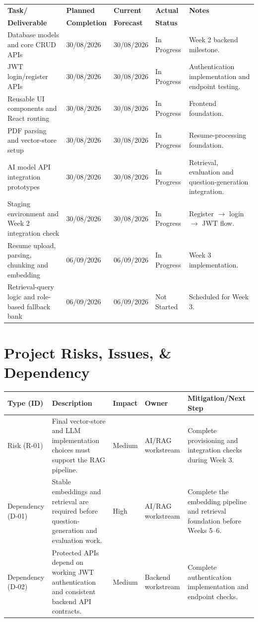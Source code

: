 \documentclass[11pt,a4paper]{article}
\begin{document}
\begin{tabular}{p{} p{} p{} p{} p{}}
\toprule
\textbf{Task/} & \textbf{Planned} & \textbf{Current} & \textbf{Actual} & \textbf{Notes} \\
\textbf{Deliverable} & \textbf{Completion} & \textbf{Forecast} & \textbf{Status} & \\
\midrule
Database models and core CRUD APIs & 30/08/2026 & 30/08/2026 & In Progress & Week 2 backend milestone. \\
JWT login/register APIs & 30/08/2026 & 30/08/2026 & In Progress & Authentication implementation and endpoint testing. \\
Reusable UI components and React routing & 30/08/2026 & 30/08/2026 & In Progress & Frontend foundation. \\
PDF parsing and vector-store setup & 30/08/2026 & 30/08/2026 & In Progress & Resume-processing foundation. \\
AI model API integration prototypes & 30/08/2026 & 30/08/2026 & In Progress & Retrieval, evaluation and question-generation integration. \\
Staging environment and Week 2 integration check & 30/08/2026 & 30/08/2026 & In Progress & Register $\rightarrow$ login $\rightarrow$ JWT flow. \\
Resume upload, parsing, chunking and embedding & 06/09/2026 & 06/09/2026 & In Progress & Week 3 implementation. \\
Retrieval-query logic and role-based fallback bank & 06/09/2026 & 06/09/2026 & Not Started & Scheduled for Week 3. \\
\bottomrule
\end{tabular}

\section{Project Risks, Issues, \& Dependency}

\begin{tabular}{p{} p{} p{} p{} p{}}
\toprule
\textbf{Type (ID)} & \textbf{Description} & \textbf{Impact} & \textbf{Owner} & \textbf{Mitigation/Next Step} \\
\midrule
Risk (R-01) & Final vector-store and LLM implementation choices must support the RAG pipeline. & Medium & AI/RAG workstream & Complete provisioning and integration checks during Week 3. \\
Dependency (D-01) & Stable embeddings and retrieval are required before question-generation and evaluation work. & High & AI/RAG workstream & Complete the embedding pipeline and retrieval foundation before Weeks 5--6. \\
Dependency (D-02) & Protected APIs depend on working JWT authentication and consistent backend API contracts. & Medium & Backend workstream & Complete authentication implementation and endpoint checks. \\
\bottomrule
\end{tabular}
\end{document}
